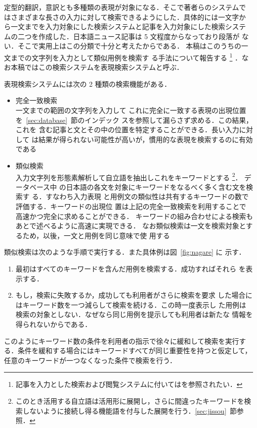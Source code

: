 定型的翻訳，意訳とも多種類の表現が対象になる．そこで著者らのシステムで
はさまざまな長さの入力に対して検索できるようにした．具体的には一文字か
ら一文までを入力対象にした検索システムと記事を入力対象にした検索システ
ムの二つを作成した．日本語ニュース記事は 5 文程度からなっており段落が
ない．そこで実用上はこの分類で十分と考えたからである．
本稿はこのうちの一文までの文字列を入力として類似用例を検索す
る手法について報告する
\footnote{
記事を入力とした検索および閲覧システムに付いては\cite{Tan97a,Tan97b,Tan99a}を参照されたい．
}
．なお本稿ではこの検索システムを表現検索システムと呼ぶ．

表現検索システムには次の 2 種類の検索機能がある．
\begin{itemize}
\vspace{-0.25mm}
\item  完全一致検索\\
\vspace{-0.25mm}\hspace*{-3pt}
一文までの範囲の文字列を入力して
これに完全に一致する表現の出現位置を~\ref{sec:database}~節のインデック
スを参照して漏らさず求める．この結果，これを
含む記事と文とその中の位置を特定することができる．長い入力に対して
は結果が得られない可能性が高いが，慣用的な表現を検索するのに有効である
\vspace{-0.25mm}
\item  類似検索\\
\vspace{-0.25mm}\hspace*{-3pt}
入力文字列を形態素解析して自立語を抽出しこれをキーワードとする
\footnote{このとき活用する自立語は活用形に展開し，さらに間違ったキーワードを検索しないように接続し得る機能語を付与した展開を行う．\ref{sec:jissou}~節参照．}．
データベース中\break
の日本語の各文を対象にキーワードをなるべく多く含む文を検索す
る．すなわち入力表現
と用例文の類似性は共有するキーワードの数で評価する．キーワードの出現位
置は上記の完全一致検索を利用することで高速かつ完全に求めることができる．
キーワードの組み合わせによる検索もあとで述べるように高速に実現できる．
なお類似検索は一文を検索対象とするため，以後，一文と用例を同じ意味で使
用する
\end{itemize}
類似検索は次のような手順で実行する．また具体例は図~\ref{fig:nagare} に
示す．
\begin{enumerate}
\item 最初はすべてのキーワードを含んだ用例を検索する．成功すればそれら
を表示する．
\item もし，検索に失敗するか，成功しても利用者がさらに検索を要求
した場合にはキーワード数を一つ減らして検索を続ける．この時一度表示し
た用例は検索の対象としない．なぜなら同じ用例を提示しても利用者は新たな
情報を得られないからである．
\end{enumerate}
このようにキーワード数の条件を利用者の指示で徐々に緩和して検索を実行す
る．条件を緩和する場合にはキーワードすべてが同じ重要性を持つと仮定して，
任意のキーワードが一つなくなった条件で検索を行う．

